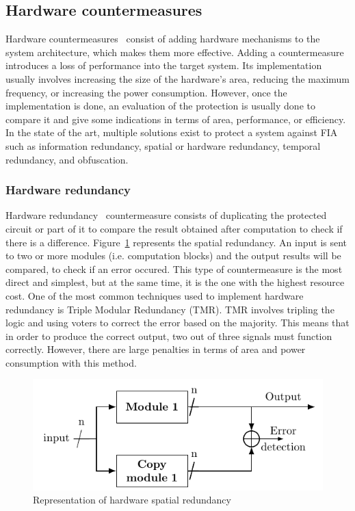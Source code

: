 \subsection{Hardware countermeasures}
Hardware countermeasures~\cite{BCNTW-06-procieee, PTAJC-22-appSci} consist of adding hardware mechanisms to the system architecture, which makes them more effective. Adding a countermeasure introduces a loss of performance into the target system. Its implementation usually involves increasing the size of the hardware's area, reducing the maximum frequency, or increasing the power consumption. However, once the implementation is done, an evaluation of the protection is usually done to compare it and give some indications in terms of area, performance, or efficiency.
In the state of the art, multiple solutions exist to protect a system against FIA such as information redundancy, spatial or hardware redundancy, temporal redundancy, and obfuscation.

\subsubsection{Hardware redundancy}
Hardware redundancy~\cite{JMR-07-iet, DFR-07-dsn, NDFR-08-ets} countermeasure consists of duplicating the protected circuit or part of it to compare the result obtained after computation to check if there is a difference. Figure~\ref{fig:spatial_redundancy} represents the spatial redundancy. An input is sent to two or more modules (i.e. computation blocks) and the output results will be compared, to check if an error occured.
This type of countermeasure is the most direct and simplest, but at the same time, it is the one with the highest resource cost.
One of the most common techniques used to implement hardware redundancy is Triple Modular Redundancy (TMR). TMR involves tripling the logic and using voters to correct the error based on the majority. This means that in order to produce the correct output, two out of three signals must function correctly. However, there are large penalties in terms of area and power consumption with this method.

\begin{figure}[ht]
    \centering
    \includegraphics[page=1]{c2_soa/img/redundancy.pdf}
    \caption{Representation of hardware spatial redundancy}
    \label{fig:spatial_redundancy}
\end{figure}

